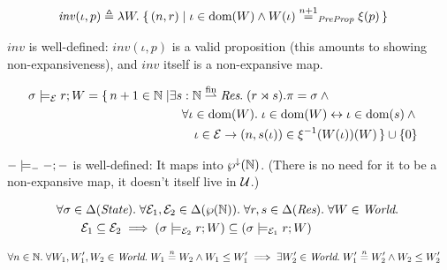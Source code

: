 \begin{align*}
	\mathit{inv}(\iota, p) &\eqdef \Lam W. \{\, (n, r) \mid \iota\in\dom(W) \land W(\iota) \nequiv{n+1}_{\textdom{PreProp}} \wIso(p) \,\}
\end{align*}
\begin{lem}
	$\mathit{inv}$ is well-defined: $\mathit{inv}(\iota, p)$ is a valid proposition (this amounts to showing non-expansiveness), and $\mathit{inv}$ itself is a non-expansive map.
\end{lem}

\begin{align*}
	\fullSat{\state}{\mask}{\rs}{W} &=
	\begin{aligned}[t]
		\{\, n + 1 \in \mathbb{N} \mid &\Exists  \rsB:\mathbb{N} \fpfn \textdom{Res}. (\rs \rtimes \rsB).\pres = \state \land{}\\
		&\quad \All \iota \in \dom(W). \iota \in \dom(W) \leftrightarrow \iota \in \dom(\rsB) \land {}\\
		&\quad\quad \iota \in \mask \ra (n, \rsB(\iota)) \in \wIso^{-1}(W(\iota))(W) \,\} \cup \{ 0 \}
	\end{aligned}
\end{align*}
\begin{lem}\label{lem:fullsat-nonexpansive}
	$- \models_{-} -; -$ is well-defined: It maps into $\wp^\downarrow(\mathbb{N})$. (There is no need for it to be a non-expansive map, it doesn't itself live in $\cal U$.)
\end{lem}

\begin{lem}\label{lem:fullsat-weaken-mask}
	\begin{align*}
		\MoveEqLeft
		\All \state \in \Delta(\textdom{State}).
		\All \mask_1, \mask_2 \in \Delta(\pset{\mathbb{N}}).
		\All \rs, \rsB \in \Delta(\textdom{Res}).
		\All W \in \textdom{World}. \\&
		\mask_1 \subseteq \mask_2 \implies (\fullSat{\state}{\mask_2}{\rs}{W}) \subseteq (\fullSat{\state}{\mask_1}{\rs}{W})
	\end{align*}
\end{lem}

\begin{lem}\label{lem:nequal_ext_world}
	\begin{align*}
		&
		\All n \in \mathbb{N}.
		\All W_1, W_1', W_2 \in \textdom{World}.
		W_1 \nequiv{n} W_2 \land W_1 \leq W_1' \implies \Exists W_2' \in \textdom{World}. W_1' \nequiv{n} W_2' \land W_2 \leq W_2'
	\end{align*}
\end{lem}

